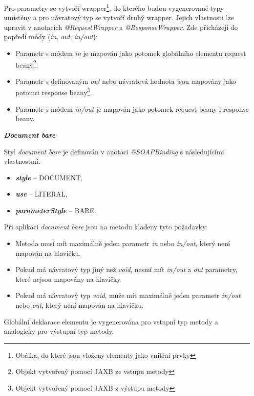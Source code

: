 \documentclass[11pt,twoside,a4paper]{book}
\begin{document}
Pro parametry se vytvoří wrapper\footnote{Obálka, do které jsou vloženy elementy
jako vnitřní prvky}, do kterého budou vygenerované typy umístěny a pro návratový
typ se vytvoří druhý wrapper. Jejich vlastnosti lze upravit v anotacích
{\em @RequestWrapper} a {\em @ResponseWrapper}. Zde přicházejí do popředí módy
({\em in}, {\em out}, {\em in/out}):

\begin{itemize}
  \item Parametr s módem {\em in} je mapován jako potomek globálního elementu
  request beany\footnote{Objekt vytvořený pomocí JAXB ze vstupu metody}.
  \item Parametr s definovaným {\em out} nebo návratová hodnota jsou mapovány
  jako potomci response beany\footnote{Objekt vytvořený pomocí JAXB z výstupu metody}.
  \item Parametr s módem {\em in/out} je mapován jako potomek request beany i
  response beany.
\end{itemize}

\textbf{\textit{Document bare}}

Styl {\em document bare} je definován v anotaci {\em @SOAPBinding} s
následujícími vlastnostmi:

\begin{itemize}
  \item \textbf{\textit{style}} – DOCUMENT,
  \item \textbf{\textit{use}} – LITERAL,
  \item \textbf{\textit{parameterStyle}} – BARE.
\end{itemize}

Při aplikaci {\em document bare} jsou na metodu kladeny tyto požadavky:

\begin{itemize}
  \item Metoda musí mít maximálně jeden parametr {\em in} nebo {\em in/out},
  který není mapován na hlavičku.
  \item Pokud má návratový typ jiný než {\em void}, nesmí mít {\em in/out} a
  {\em out} parametry, které nejsou mapovány na hlavičky.
  \item Pokud má návratový typ {\em void}, může mít maximálně jeden parametr
  {\em in/out} nebo {\em out}, který není mapován na hlavičku.
\end{itemize}

Globální deklarace elementu je vygenerována pro vstupní typ metody a analogicky pro
výstupní typ metody.
\end{document}
